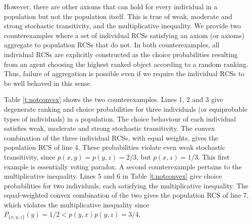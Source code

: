\documentclass[11pt,letter]{article}
\begin{document}
However, there are other axioms that can hold for every individual in a population but not the population itself.
This is true of weak, moderate and strong stochastic transitivity, and the multiplicative inequality.
We provide two counterexamples where a set of individual RCSs satisfying an axiom (or axioms) aggregate to population RCSs that do not.
In both counterexamples, all individual RCSs are explicitly constructed as the choice probabilities resulting from an agent choosing the highest ranked object according to a  random ranking.
Thus, failure of aggregation is possible even if we require the individual RCSs to be well behaved in this sense.

Table \ref{t:notconvex} shows the two counterexamples. 
Lines 1, 2 and 3 give degenerate ranking and choice probabilities for three individuals (or equiprobable types of individuals) in a population.
The choice behaviour of each individual satisfies weak, moderate and strong stochastic transitivity.
The convex combination of the three individual RCSs, with equal weights, gives the population RCS of line 4.
These probabilities violate even weak stochastic transitivity, since $p(x,y) = p(y,z) = 2/3$, but $p(x,z) = 1/3$.
This first example is essentially  voting paradox.
A second counterexample pertains to the multiplicative inequality.
Lines 5 and 6 in Table \ref{t:notconvex} give choice probabilities for two individuals, each satisfying the multiplicative inequality.
The equal-weighted convex combination of the two gives the population RCS of line 7,
which violates the multiplicative inequality since $P_{\{x,y,z\}}(y) = 1/2 < p(y,x)p(y,z) = 3/4$.
\end{document}
